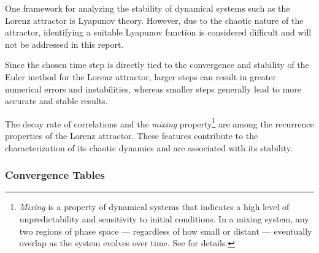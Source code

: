 \documentclass[12pt, a4paper]{article}
\begin{document}
	One framework for analyzing the stability of dynamical systems such as the Lorenz attractor is Lyapunov theory. However, due to the chaotic nature of the attractor, identifying a suitable Lyapunov function is considered difficult and will not be addressed in this report.
	
	Since the chosen time step is directly tied to the convergence and stability of the Euler method for the Lorenz attractor, larger steps can result in greater numerical errors and instabilities, whereas smaller steps generally lead to more accurate and stable results.
	
	The decay rate of correlations and the \textit{mixing} property\footnote{\textit{Mixing} is a property of dynamical systems that indicates a high level of unpredictability and sensitivity to initial conditions. In a mixing system, any two regions of phase space — regardless of how small or distant — eventually overlap as the system evolves over time. See \cite{Luzzatto2004} for details.} are among the recurrence properties of the Lorenz attractor. These features contribute to the characterization of its chaotic dynamics and are associated with its stability.
	
	\subsubsection{Convergence Tables}
	
\end{document}
